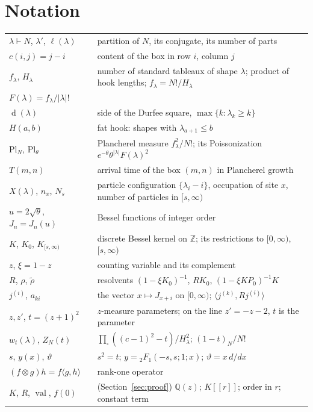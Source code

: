 \documentclass[11pt]{article}
\theoremstyle{definition}
\theoremstyle{remark}
\newcommand{\Z}{\mathbb{Z}}
\newcommand{\Pl}{\mathrm{Pl}}
\newcommand{\F}[4]{{}_2F_1\!\left(#1,#2;#3;#4\right)}
\DeclareMathOperator{\Durfee}{d}
\begin{document}
\section*{Notation}
\begin{center}\small
\begin{tabular}{lp{3.9in}}
\toprule
$\lambda\vdash N$, $\lambda'$, $\ell(\lambda)$ & partition of $N$, its conjugate, its number of parts\\
$c(i,j)=j-i$ & content of the box in row $i$, column $j$\\
$f_\lambda$, $H_\lambda$ & number of standard tableaux of shape $\lambda$; product of hook lengths; $f_\lambda=N!/H_\lambda$\\
$F(\lambda)=f_\lambda/|\lambda|!$ & \\
$\Durfee(\lambda)$ & side of the Durfee square, $\max\{k:\lambda_k\ge k\}$\\
$H(a,b)$ & fat hook: shapes with $\lambda_{a+1}\le b$\\
$\Pl_N$, $\Pl_\theta$ & Plancherel measure $f_\lambda^2/N!$; its Poissonization $e^{-\theta}\theta^{|\lambda|}F(\lambda)^2$\\
$T(m,n)$ & arrival time of the box $(m,n)$ in Plancherel growth\\
$X(\lambda)$, $n_x$, $N_s$ & particle configuration $\{\lambda_i-i\}$, occupation of site $x$, number of particles in $[s,\infty)$\\
$u=2\sqrt\theta$, $J_n=J_n(u)$ & Bessel functions of integer order\\
$K$, $K_0$, $K_{[s,\infty)}$ & discrete Bessel kernel on $\Z$; its restrictions to $[0,\infty)$, $[s,\infty)$\\
$z$, $\xi=1-z$ & counting variable and its complement\\
$R$, $\rho$, $\tilde\rho$ & resolvents $(1-\xi K_0)^{-1}$, $RK_0$, $(1-\xi KP_0)^{-1}K$\\
$j^{(i)}$, $a_{ki}$ & the vector $x\mapsto J_{x+i}$ on $[0,\infty)$; $\langle j^{(k)},Rj^{(i)}\rangle$\\
$z,z'$, $t=(z+1)^2$ & $z$-measure parameters; on the line $z'=-z-2$, $t$ is the parameter\\
$w_t(\lambda)$, $Z_N(t)$ & $\prod_\square((c-1)^2-t)/H_\lambda^2$; $(1-t)_N/N!$\\
$s$, $y(x)$, $\vartheta$ & $s^2=t$; $y=\F{-s}{s}{1}{x}$; $\vartheta=x\,d/dx$\\
$(f\otimes g)h=f\langle g,h\rangle$ & rank-one operator\\
$K$, $R$, $\operatorname{val}$, $f(0)$ & (Section~\ref{sec:proof}) $\mathbb Q(z)$; $K[[r]]$; order in $r$; constant term\\

\end{tabular}
\end{center}
\end{document}
